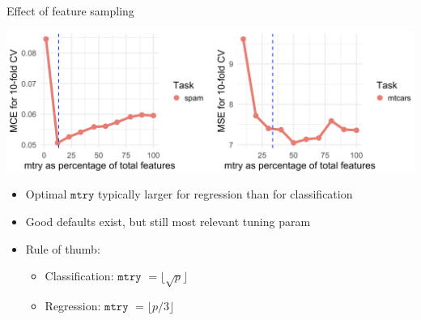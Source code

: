 \documentclass[11pt,compress,t,notes=noshow, xcolor=table]{beamer}
\begin{document}
\begin{vbframe}{Effect of feature sampling}

\begin{center}
\includegraphics[width=1\textwidth]{figure/forest-mtry.png}
\end{center}

\begin{itemize}

\item Optimal $\texttt{mtry}$ typically larger for regression than for classification
\item Good defaults exist, but still most relevant tuning param
\item Rule of thumb:
\begin{itemize}
\item Classification: $\texttt{mtry}$ $ = \lfloor \sqrt{p} \rfloor$
\item Regression: $\texttt{mtry}$ $ = \lfloor p/3 \rfloor$
\end{itemize}
\end{itemize}

\end{vbframe}
\end{document}
